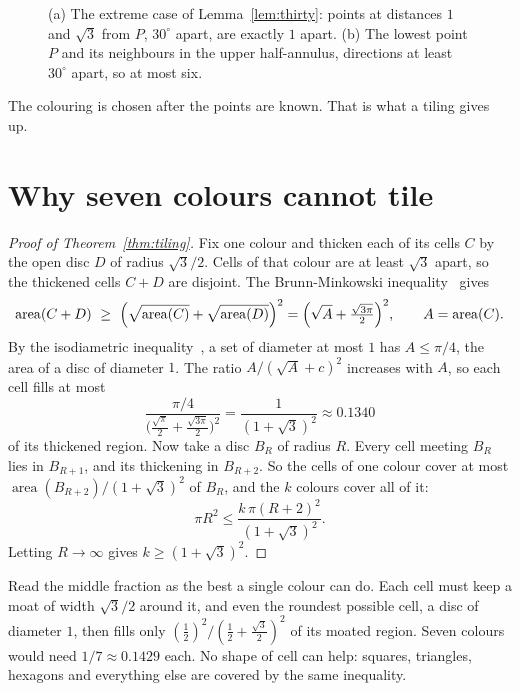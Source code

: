 \documentclass[11pt]{amsart}
\theoremstyle{remark}
\begin{document}
\begin{figure}[ht]
\centering
\begin{tikzpicture}
  
\end{tikzpicture}
\caption{(a) The extreme case of Lemma~\ref{lem:thirty}: points at distances $1$ and $\sqrt3$ from $P$, $30^\circ$ apart, are exactly $1$ apart. (b) The lowest point $P$ and its neighbours in the upper half-annulus, directions at least $30^\circ$ apart, so at most six.}
\label{fig:proof}
\end{figure}

The colouring is chosen after the points are known. That is what a tiling gives up.

\section{Why seven colours cannot tile}

\begin{proof}[Proof of Theorem~\ref{thm:tiling}]
Fix one colour and thicken each of its cells $C$ by the open disc $D$ of radius $\sqrt3/2$. Cells of that colour are at least $\sqrt3$ apart, so the thickened cells $C+D$ are disjoint. The Brunn-Minkowski inequality~\cite{Gardner} gives
\[
\operatorname{area}(C+D)\ \ge\ \Bigl(\sqrt{\operatorname{area}(C)}+\sqrt{\operatorname{area}(D)}\Bigr)^2=\Bigl(\sqrt{A}+\tfrac{\sqrt{3\pi}}2\Bigr)^2,\qquad A=\operatorname{area}(C).
\]
By the isodiametric inequality~\cite{Gardner}, a set of diameter at most $1$ has $A\le\pi/4$, the area of a disc of diameter $1$. The ratio $A/(\sqrt A+c)^2$ increases with $A$, so each cell fills at most
\[
\frac{\pi/4}{\bigl(\tfrac{\sqrt\pi}2+\tfrac{\sqrt{3\pi}}2\bigr)^2}=\frac1{(1+\sqrt3)^2}\approx0.1340
\]
of its thickened region. Now take a disc $B_R$ of radius $R$. Every cell meeting $B_R$ lies in $B_{R+1}$, and its thickening in $B_{R+2}$. So the cells of one colour cover at most $\operatorname{area}(B_{R+2})/(1+\sqrt3)^2$ of $B_R$, and the $k$ colours cover all of it:
\[
\pi R^2\le\frac{k\,\pi(R+2)^2}{(1+\sqrt3)^2}.
\]
Letting $R\to\infty$ gives $k\ge(1+\sqrt3)^2$.
\end{proof}

Read the middle fraction as the best a single colour can do. Each cell must keep a moat of width $\sqrt3/2$ around it, and even the roundest possible cell, a disc of diameter $1$, then fills only $(\frac12)^2/(\frac12+\frac{\sqrt3}2)^2$ of its moated region. Seven colours would need $1/7\approx0.1429$ each. No shape of cell can help: squares, triangles, hexagons and everything else are covered by the same inequality.
\end{document}
